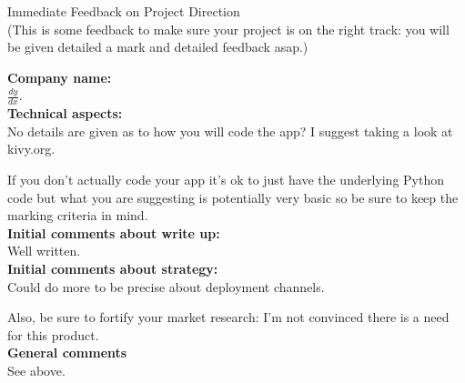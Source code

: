 \documentclass{article}
\begin{document}
\begin{center}
\Huge{Immediate Feedback on Project Direction}\\
\tiny{(This is some feedback to make sure your project is on the right track: you will be given detailed a mark and detailed feedback asap.)}
\end{center}


\normalsize
\textbf{Company name:}\\

\(\frac{dy}{dx}\). \\

\textbf{Technical aspects:}\\

No details are given as to how you will code the app? I suggest taking a look at kivy.org.

If you don't actually code your app it's ok to just have the underlying Python code but what you are suggesting is potentially very basic so be sure to keep the marking criteria in mind.\\

\textbf{Initial comments about write up:}\\

Well written.\\

\textbf{Initial comments about strategy:}\\

Could do more to be precise about deployment channels.

Also, be sure to fortify your market research: I'm not convinced there is a need for this product.\\

\textbf{General comments}\\

See above.\\
\end{document}
